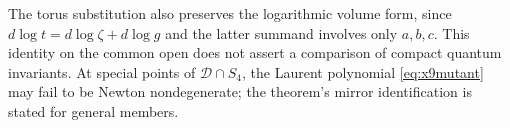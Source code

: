 The torus substitution also preserves the logarithmic volume form,
since $d\log t=d\log\zeta+d\log g$ and the latter summand involves
only $a,b,c$. This identity on the common open does not assert a
comparison of compact quantum invariants. At special points of
$\mathcal D\cap S_4$, the Laurent polynomial
\eqref{eq:x9mutant} may fail to be Newton nondegenerate; the theorem's
mirror identification is stated for general members.
